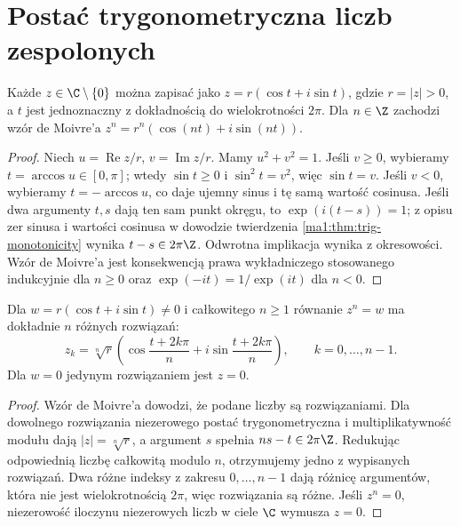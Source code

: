 \section{Postać trygonometryczna liczb zespolonych}
\begin{twierdzenie}
\label{ma1:thm:polar-complex}
Każde $z\in\C\setminus\{0\}$ można zapisać jako $z=r(\cos t+i\sin t)$, gdzie $r=|z|>0$, a $t$ jest jednoznaczny z dokładnością do wielokrotności $2\pi$. Dla $n\in\Z$ zachodzi wzór de Moivre'a
$z^n=r^n(\cos(nt)+i\sin(nt))$.
\end{twierdzenie}
\begin{proof}
Niech $u=\operatorname{Re}z/r$, $v=\operatorname{Im}z/r$. Mamy $u^2+v^2=1$. Jeśli $v\ge0$, wybieramy $t=\arccos u\in[0,\pi]$; wtedy $\sin t\ge0$ i $\sin^2t=v^2$, więc $\sin t=v$. Jeśli $v<0$, wybieramy $t=-\arccos u$, co daje ujemny sinus i tę samą wartość cosinusa. Jeśli dwa argumenty $t,s$ dają ten sam punkt okręgu, to $\exp(i(t-s))=1$; z opisu zer sinusa i wartości cosinusa w dowodzie twierdzenia \ref{ma1:thm:trig-monotonicity} wynika $t-s\in2\pi\Z$. Odwrotna implikacja wynika z okresowości. Wzór de Moivre'a jest konsekwencją prawa wykładniczego stosowanego indukcyjnie dla $n\ge0$ oraz $\exp(-it)=1/\exp(it)$ dla $n<0$.
\end{proof}
\begin{wniosek}
\label{ma1:cor:complex-nth-roots}
Dla $w=r(\cos t+i\sin t)\ne0$ i całkowitego $n\ge1$ równanie $z^n=w$ ma dokładnie $n$ różnych rozwiązań:
\[
 z_k=\sqrt[n]r\left(\cos\frac{t+2k\pi}{n}
                  +i\sin\frac{t+2k\pi}{n}\right),
 \qquad k=0,\ldots,n-1.
\]
Dla $w=0$ jedynym rozwiązaniem jest $z=0$.
\end{wniosek}
\begin{proof}
Wzór de Moivre'a dowodzi, że podane liczby są rozwiązaniami. Dla dowolnego rozwiązania niezerowego postać trygonometryczna i multiplikatywność modułu dają $|z|=\sqrt[n]r$, a argument $s$ spełnia $ns-t\in2\pi\Z$. Redukując odpowiednią liczbę całkowitą modulo $n$, otrzymujemy jedno z wypisanych rozwiązań. Dwa różne indeksy z zakresu $0,\ldots,n-1$ dają różnicę argumentów, która nie jest wielokrotnością $2\pi$, więc rozwiązania są różne. Jeśli $z^n=0$, niezerowość iloczynu niezerowych liczb w ciele $\C$ wymusza $z=0$.
\end{proof}
